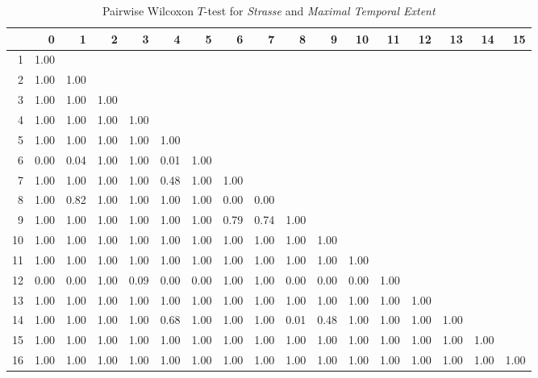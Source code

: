\begin{table}[ht!]
	\tiny
	\setlength{\tabcolsep}{4pt}
	\centering
  \begin{tabular}{rrrrrrrrrrrrrrrrr}
    \hline
   & 0 & 1 & 2 & 3 & 4 & 5 & 6 & 7 & 8 & 9 & 10 & 11 & 12 & 13 & 14 & 15 \\ 
    \hline
  1 & 1.00 &  &  &  &  &  &  &  &  &  &  &  &  &  &  &  \\ 
    2 & 1.00 & 1.00 &  &  &  &  &  &  &  &  &  &  &  &  &  &  \\ 
    3 & 1.00 & 1.00 & 1.00 &  &  &  &  &  &  &  &  &  &  &  &  &  \\ 
    4 & 1.00 & 1.00 & 1.00 & 1.00 &  &  &  &  &  &  &  &  &  &  &  &  \\ 
    5 & 1.00 & 1.00 & 1.00 & 1.00 & 1.00 &  &  &  &  &  &  &  &  &  &  &  \\ 
    6 & 0.00 & 0.04 & 1.00 & 1.00 & 0.01 & 1.00 &  &  &  &  &  &  &  &  &  &  \\ 
    7 & 1.00 & 1.00 & 1.00 & 1.00 & 0.48 & 1.00 & 1.00 &  &  &  &  &  &  &  &  &  \\ 
    8 & 1.00 & 0.82 & 1.00 & 1.00 & 1.00 & 1.00 & 0.00 & 0.00 &  &  &  &  &  &  &  &  \\ 
    9 & 1.00 & 1.00 & 1.00 & 1.00 & 1.00 & 1.00 & 0.79 & 0.74 & 1.00 &  &  &  &  &  &  &  \\ 
    10 & 1.00 & 1.00 & 1.00 & 1.00 & 1.00 & 1.00 & 1.00 & 1.00 & 1.00 & 1.00 &  &  &  &  &  &  \\ 
    11 & 1.00 & 1.00 & 1.00 & 1.00 & 1.00 & 1.00 & 1.00 & 1.00 & 1.00 & 1.00 & 1.00 &  &  &  &  &  \\ 
    12 & 0.00 & 0.00 & 1.00 & 0.09 & 0.00 & 0.00 & 1.00 & 1.00 & 0.00 & 0.00 & 0.00 & 1.00 &  &  &  &  \\ 
    13 & 1.00 & 1.00 & 1.00 & 1.00 & 1.00 & 1.00 & 1.00 & 1.00 & 1.00 & 1.00 & 1.00 & 1.00 & 1.00 &  &  &  \\ 
    14 & 1.00 & 1.00 & 1.00 & 1.00 & 0.68 & 1.00 & 1.00 & 1.00 & 0.01 & 0.48 & 1.00 & 1.00 & 1.00 & 1.00 &  &  \\ 
    15 & 1.00 & 1.00 & 1.00 & 1.00 & 1.00 & 1.00 & 1.00 & 1.00 & 1.00 & 1.00 & 1.00 & 1.00 & 1.00 & 1.00 & 1.00 &  \\ 
    16 & 1.00 & 1.00 & 1.00 & 1.00 & 1.00 & 1.00 & 1.00 & 1.00 & 1.00 & 1.00 & 1.00 & 1.00 & 1.00 & 1.00 & 1.00 & 1.00 \\ 
     \hline
  \end{tabular}
	\caption{Pairwise Wilcoxon $T$-test for \textit{Strasse} and \textit{Maximal Temporal Extent}}
	\label{tbl:wilcoxon_baysis_matched_Strasse_TMax}
\end{table}
